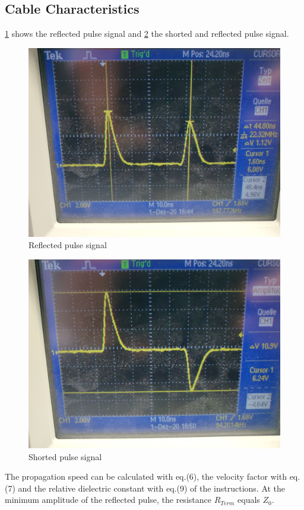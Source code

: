     \subsection{Cable Characteristics}
        \cref{fig:3-3-2reflectiontime} shows the reflected pulse signal and \cref{fig:3-3-2shorted} the shorted and reflected
        pulse signal.
        \begin{figure}[p]
            \centering
            \includegraphics[width=0.7\linewidth]{messdaten/3-3-2_reflectionTime.jpg}
            \caption[Reflected pulse signal]{Reflected pulse signal}
            \label{fig:3-3-2reflectiontime}
        \end{figure}
        \begin{figure}[p]
            \centering
            \includegraphics[width=0.7\linewidth]{messdaten/3-3-2_shorted.jpg}
            \caption[Shorted pulse signal]{Shorted pulse signal}
            \label{fig:3-3-2shorted}
        \end{figure}
        The propagation speed can be calculated with eq.(6), the velocity factor with eq.(7) and the relative dielectric constant
        with eq.(9) of the instructions. At the minimum amplitude of the reflected pulse, the resistance $ R_{Term} $ equals $ Z_0 $.\par
